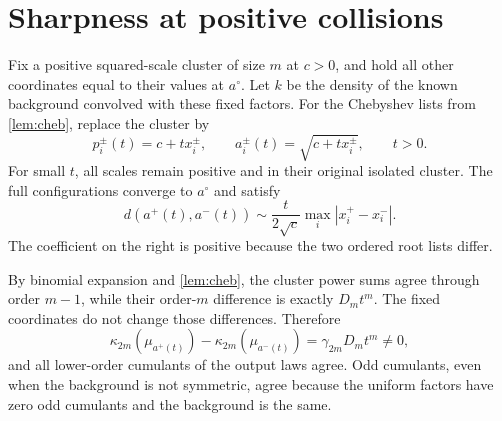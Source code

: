 \documentclass[11pt,a4paper]{article}
\numberwithin{equation}{section}
\theoremstyle{definition}
\theoremstyle{remark}
\newcommand{\kap}{\kappa}
\newcommand{\base}{a^{\circ}}
\begin{document}
\section{Sharpness at positive collisions}
\label{sec:positive-sharp}

Fix a positive squared-scale cluster of size $m$ at $c>0$, and hold all other
coordinates equal to their values at $\base$.  Let $k$ be the density of the
known background convolved with these fixed factors.  For the Chebyshev lists
from \cref{lem:cheb}, replace the cluster by
\begin{equation}
 p_i^\pm(t)=c+t x_i^\pm,\qquad
 a_i^\pm(t)=\sqrt{c+t x_i^\pm},\qquad t>0.
 \label{eq:positive-paths}
\end{equation}
For small $t$, all scales remain positive and in their original isolated cluster.
The full configurations converge to $\base$ and satisfy
\begin{equation}
 d(a^+(t),a^-(t))\sim
 \frac{t}{2\sqrt c}\max_i|x_i^+-x_i^-|.
 \label{eq:positive-distance}
\end{equation}
The coefficient on the right is positive because the two ordered root lists
differ.

By binomial expansion and \cref{lem:cheb}, the cluster power sums agree through
order $m-1$, while their order-$m$ difference is exactly $D_mt^m$.
The fixed coordinates do not change those differences.  Therefore
\begin{equation}
 \kap_{2m}(\mu_{a^+(t)})-\kap_{2m}(\mu_{a^-(t)})
 =\gamma_{2m}D_mt^m\ne0,
 \label{eq:positive-kappa}
\end{equation}
and all lower-order cumulants of the output laws agree.  Odd cumulants, even
when the background is not symmetric, agree because the uniform factors have
zero odd cumulants and the background is the same.
\end{document}
